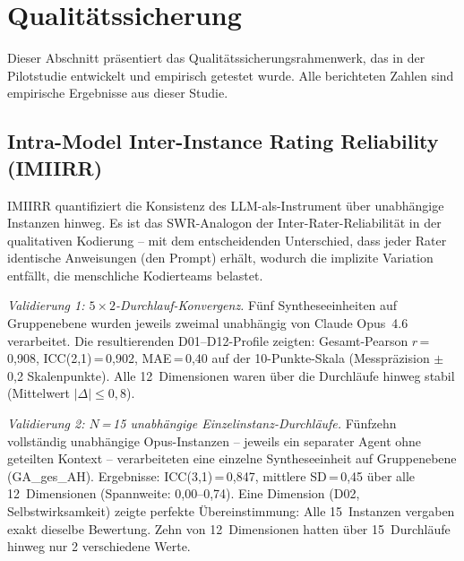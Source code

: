 \documentclass[11pt,a4paper]{article}
\begin{document}
\section{Qualit\"atssicherung}
\label{sec:qa}

Dieser Abschnitt pr\"asentiert das Qualit\"atssicherungsrahmenwerk, das in der Pilotstudie \citep{Geiger2026PaperA} entwickelt und empirisch getestet wurde. Alle berichteten Zahlen sind empirische Ergebnisse aus dieser Studie.


\subsection{Intra-Model Inter-Instance Rating Reliability (IMIIRR)}
\label{sec:qa:imiirr}

IMIIRR quantifiziert die Konsistenz des LLM-als-Instrument \"uber unabh\"angige Instanzen hinweg. Es ist das SWR-Analogon der Inter-Rater-Reliabilit\"at in der qualitativen Kodierung -- mit dem entscheidenden Unterschied, dass jeder \glqq{}Rater\grqq{} identische Anweisungen (den Prompt) erh\"alt, wodurch die implizite Variation entf\"allt, die menschliche Kodierteams belastet.

\emph{Validierung 1: $5 \times 2$-Durchlauf-Konvergenz.} F\"unf Syntheseeinheiten auf Gruppenebene wurden jeweils zweimal unabh\"angig von Claude Opus~4.6 verarbeitet. Die resultierenden D01--D12-Profile zeigten: Gesamt-Pearson $r$\,=\,0,908, ICC(2,1)\,=\,0,902, MAE\,=\,0,40 auf der 10-Punkte-Skala (Messpräzision $\pm$\,0,2 Skalenpunkte). Alle 12~Dimensionen waren \"uber die Durchl\"aufe hinweg stabil (Mittelwert $|\Delta| \leq 0,8$).

\emph{Validierung 2: $N$\,=\,15 unabh\"angige Einzelinstanz-Durchl\"aufe.} F\"unfzehn vollst\"andig unabh\"angige Opus-Instanzen -- jeweils ein separater Agent ohne geteilten Kontext -- verarbeiteten eine einzelne Syntheseeinheit auf Gruppenebene (GA\_ges\_AH). Ergebnisse: ICC(3,1)\,=\,0,847, mittlere SD\,=\,0,45 \"uber alle 12~Dimensionen (Spannweite: 0,00--0,74). Eine Dimension (D02, Selbstwirksamkeit) zeigte perfekte \"Ubereinstimmung: Alle 15~Instanzen vergaben exakt dieselbe Bewertung. Zehn von 12~Dimensionen hatten \"uber 15~Durchl\"aufe hinweg nur 2 verschiedene Werte.
\end{document}

